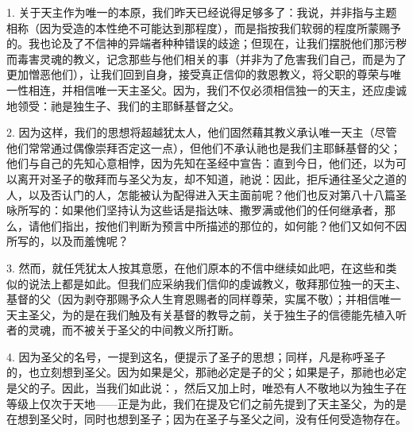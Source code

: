 \par

1. 关于天主作为唯一的本原，我们昨天已经说得足够多了：我说，并非指与主题相称（因为受造的本性绝不可能达到那程度），而是指按我们软弱的程度所蒙赐予的。我也论及了不信神的异端者种种错误的歧途；但现在，让我们摆脱他们那污秽而毒害灵魂的教义，记念那些与他们相关的事（并非为了危害我们自己，而是为了更加憎恶他们），让我们回到自身，接受真正信仰的救恩教义，将父职的尊荣与唯一性相连，并相信唯一天主圣父。因为，我们不仅必须相信独一的天主，还应虔诚地领受：祂是独生子、我们的主耶稣基督之父。\par

2. 因为这样，我们的思想将超越犹太人，他们固然藉其教义承认唯一天主（尽管他们常常通过偶像崇拜否定这一点），但他们不承认祂也是我们主耶稣基督的父；他们与自己的先知心意相悖，因为先知在圣经中宣告：直到今日，他们还，以为可以离开对圣子的敬拜而与圣父为友，却不知道，祂说：因此，拒斥通往圣父之道的人，以及否认门的人，怎能被认为配得进入天主面前呢？他们也反对第八十八篇圣咏所写的：如果他们坚持认为这些话是指达味、撒罗满或他们的任何继承者，那么，请他们指出，按他们判断为预言中所描述的那位的，如何能？他们又如何不因所写的，以及而羞愧呢？\par

3. 然而，就任凭犹太人按其意愿，在他们原本的不信中继续如此吧，在这些和类似的说法上都是如此。但我们应采纳我们信仰的虔诚教义，敬拜那位独一的天主、基督的父（因为剥夺那赐予众人生育恩赐者的同样尊荣，实属不敬）；并相信唯一天主圣父，为的是在我们触及有关基督的教导之前，关于独生子的信德能先植入听者的灵魂，而不被关于圣父的中间教义所打断。\par

4. 因为圣父的名号，一提到这名，便提示了圣子的思想；同样，凡是称呼圣子的，也立刻想到圣父。因为如果是父，那祂必定是子的父；如果是子，那祂也必定是父的子。因此，当我们如此说：，然后又加上时，唯恐有人不敬地以为独生子在等级上仅次于天地——正是为此，我们在提及它们之前先提到了天主圣父，为的是在想到圣父时，同时也想到圣子；因为在圣子与圣父之间，没有任何受造物存在。\par

